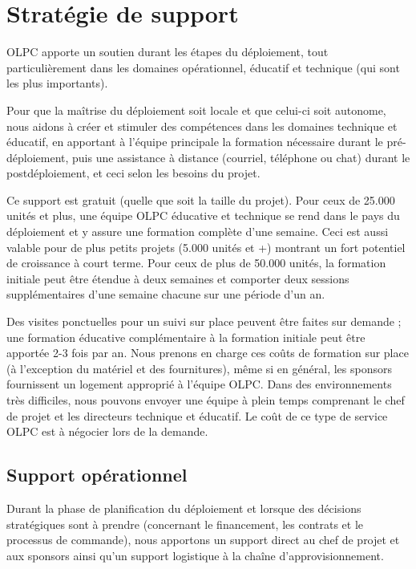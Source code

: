 \documentclass[11pt]{article}
\begin{document}
\section{Stratégie de support}
\label{sec-5}



OLPC apporte un soutien durant les étapes du déploiement, tout
particulièrement dans les domaines opérationnel, éducatif et technique (qui
sont les plus importants).

Pour que la maîtrise du déploiement soit locale et que celui-ci soit
autonome, nous aidons à créer et stimuler des compétences dans les domaines
technique et éducatif, en apportant à l'équipe principale la formation
nécessaire durant le pré-déploiement, puis une assistance à distance
(courriel, téléphone ou chat) durant le postdéploiement, et ceci selon les
besoins du projet.

Ce support est gratuit (quelle que soit la taille du projet). Pour ceux de
25.000 unités et plus, une équipe OLPC éducative et technique se rend dans
le pays du déploiement et y assure une formation complète d'une
semaine. Ceci est aussi valable pour de plus petits projets (5.000 unités
et +) montrant un fort potentiel de croissance à court terme. Pour ceux de
plus de 50.000 unités, la formation initiale peut être étendue à deux
semaines et comporter deux sessions supplémentaires d'une semaine chacune
sur une période d'un an.

Des visites ponctuelles pour un suivi sur place peuvent être faites sur
demande ; une formation éducative complémentaire à la formation initiale
peut être apportée 2-3 fois par an. Nous prenons en charge ces coûts de
formation sur place (à l'exception du matériel et des fournitures), même si
en général, les sponsors fournissent un logement approprié à l'équipe OLPC.
Dans des environnements très difficiles, nous pouvons envoyer une équipe à
plein temps comprenant le chef de projet et les directeurs technique et
éducatif. Le coût de ce type de service OLPC est à négocier lors de la
demande.
\subsection{Support opérationnel}
\label{sec-5-1}


Durant la phase de planification du déploiement et lorsque des décisions
stratégiques sont à prendre (concernant le financement, les contrats et le
processus de commande), nous apportons un support direct au chef de projet
et aux sponsors ainsi qu'un support logistique à la chaîne
d'approvisionnement.
\end{document}

